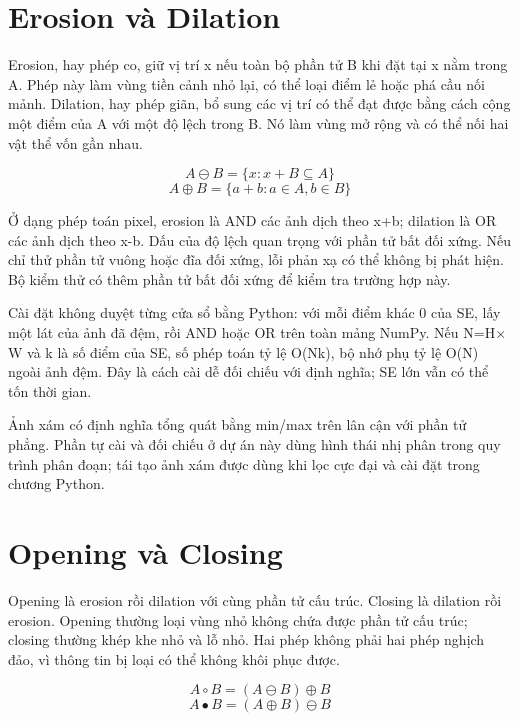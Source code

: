 \documentclass[12pt,a4paper,oneside]{report}
\begin{document}
\section{Erosion và Dilation}
Erosion, hay phép co, giữ vị trí x nếu toàn bộ phần tử B khi đặt tại x nằm trong A. Phép này làm vùng tiền cảnh nhỏ lại, có thể loại điểm lẻ hoặc phá cầu nối mảnh. Dilation, hay phép giãn, bổ sung các vị trí có thể đạt được bằng cách cộng một điểm của A với một độ lệch trong B. Nó làm vùng mở rộng và có thể nối hai vật thể vốn gần nhau.

\begin{equation}A\ominus B=\{x:x+B\subseteq A\}\end{equation}
\begin{equation}A\oplus B=\{a+b:a\in A,b\in B\}\end{equation}

Ở dạng phép toán pixel, erosion là AND các ảnh dịch theo x+b; dilation là OR các ảnh dịch theo x-b. Dấu của độ lệch quan trọng với phần tử bất đối xứng. Nếu chỉ thử phần tử vuông hoặc đĩa đối xứng, lỗi phản xạ có thể không bị phát hiện. Bộ kiểm thử có thêm phần tử bất đối xứng để kiểm tra trường hợp này.

Cài đặt không duyệt từng cửa sổ bằng Python: với mỗi điểm khác 0 của SE, lấy một lát của ảnh đã đệm, rồi AND hoặc OR trên toàn mảng NumPy. Nếu N=H\ensuremath{\times}W và k là số điểm của SE, số phép toán tỷ lệ O(Nk), bộ nhớ phụ tỷ lệ O(N) ngoài ảnh đệm. Đây là cách cài dễ đối chiếu với định nghĩa; SE lớn vẫn có thể tốn thời gian.

Ảnh xám có định nghĩa tổng quát bằng min/max trên lân cận với phần tử phẳng. Phần tự cài và đối chiếu ở dự án này dùng hình thái nhị phân trong quy trình phân đoạn; tái tạo ảnh xám được dùng khi lọc cực đại và cài đặt trong chương Python.

\section{Opening và Closing}
Opening là erosion rồi dilation với cùng phần tử cấu trúc. Closing là dilation rồi erosion. Opening thường loại vùng nhỏ không chứa được phần tử cấu trúc; closing thường khép khe nhỏ và lỗ nhỏ. Hai phép không phải hai phép nghịch đảo, vì thông tin bị loại có thể không khôi phục được.

\begin{equation}A\circ B=(A\ominus B)\oplus B\end{equation}
\begin{equation}A\bullet B=(A\oplus B)\ominus B\end{equation}
\end{document}
